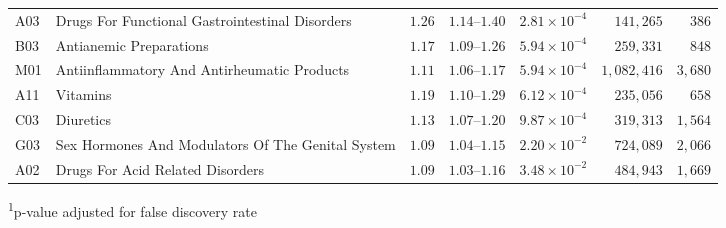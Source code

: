 \begin{longtable}{llrrrrr}
A03 & Drugs For Functional Gastrointestinal Disorders & $1.26$ & $1.14$–$1.40$ & $2.81 \times 10^{-4}$ & $141,265$ & $386$ \\ 
B03 & Antianemic Preparations & $1.17$ & $1.09$–$1.26$ & $5.94 \times 10^{-4}$ & $259,331$ & $848$ \\ 
M01 & Antiinflammatory And Antirheumatic Products & $1.11$ & $1.06$–$1.17$ & $5.94 \times 10^{-4}$ & $1,082,416$ & $3,680$ \\ 
A11 & Vitamins & $1.19$ & $1.10$–$1.29$ & $6.12 \times 10^{-4}$ & $235,056$ & $658$ \\ 
C03 & Diuretics & $1.13$ & $1.07$–$1.20$ & $9.87 \times 10^{-4}$ & $319,313$ & $1,564$ \\ 
G03 & Sex Hormones And Modulators Of The Genital System & $1.09$ & $1.04$–$1.15$ & $2.20 \times 10^{-2}$ & $724,089$ & $2,066$ \\ 
A02 & Drugs For Acid Related Disorders & $1.09$ & $1.03$–$1.16$ & $3.48 \times 10^{-2}$ & $484,943$ & $1,669$ \\ 
\bottomrule
\end{longtable}
\begin{minipage}{\linewidth}
\textsuperscript{1}p-value adjusted for false discovery rate\\
\end{minipage}

